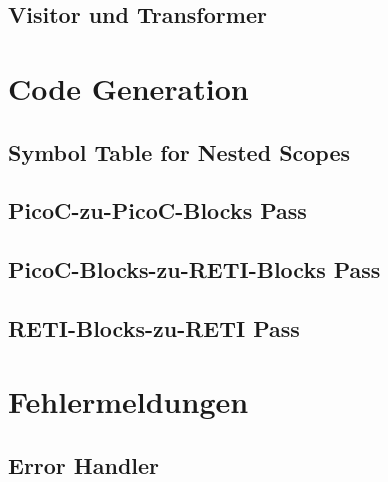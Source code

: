 \subsection{Visitor und Transformer}
\section{Code Generation}
\subsection{Symbol Table for Nested Scopes}
\subsection{PicoC-zu-PicoC-Blocks Pass}
\subsection{PicoC-Blocks-zu-RETI-Blocks Pass}
\subsection{RETI-Blocks-zu-RETI Pass}
\section{Fehlermeldungen}
\subsection{Error Handler}
